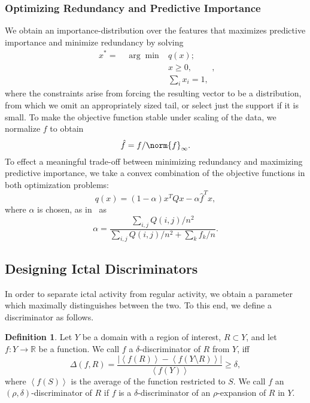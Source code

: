 \documentclass{article} %
\theoremstyle{definition}
\newtheorem{definition}{Definition}[section]
\theoremstyle{remark}
\newcommand{\mean}[1]{\left \langle #1 \right \rangle}
\newcommand{\abs}[1]{\left| #1 \right|}
\newcommand{\rl}{\mathbb{R}}
\renewcommand{\a}{\alpha}
\renewcommand{\d}{\delta}
\begin{document}
\subsubsection{Optimizing Redundancy and Predictive Importance}
We obtain an importance-distribution over the features that maximizes predictive importance and minimize redundancy by solving 
\[ \begin{array}{cl} x^* = \quad \arg \min  & q(x); \\  &  x \geq 0, \\  & \sum_i x_i  = 1, \end{array}, \]
where the constraints arise from forcing the resulting vector to be a distribution, from which we omit an appropriately sized tail, or select just the support if it is small. To make the objective function stable under scaling of the data, we normalize $f$ to obtain
\[ \hat{f} = f/\norm{f}_{\infty}. \]
To effect a meaningful trade-off between minimizing redundancy and maximizing predictive importance, we take a convex combination of the objective functions in both optimization problems:
\[ q(x) = (1 - \a) x^T Q x - \a  \hat{f}^T x, \]
where $\a$ is chosen, as in~\cite{quadprog_featsel} as 
\[ \a  = \frac{\sum_{i, j} Q(i, j) /n^2}{\sum_{i, j} Q(i, j)/n^2 + \sum_k f_k / n}. \]

\subsection{Designing Ictal Discriminators} \label{sec:seizure_predict_method}
In order to separate ictal activity from regular activity, we obtain a parameter which maximally distinguishes between the two. To this end, we define a discriminator as follows.

\begin{definition}
Let $Y$ be a domain with a region of interest, $R \subset Y$, and let $f: Y \to \rl$ be a function. We call $f$ a $\d$-discriminator of $R$ from $Y$, iff
\[ \Delta(f, R) = \frac{\abs{\mean{f(R)} - \mean{f(Y \setminus R)}}}{\mean{f(Y)}} \geq \d, \]
where $\mean{f(S)}$ is the average of the function restricted to $S$.
We call $f$ an $(\rho, \delta)$-discriminator of $R$ if $f$ is a $\delta$-discriminator of an $\rho$-expansion of $R$ in $Y$.
\end{definition}
\end{document}

